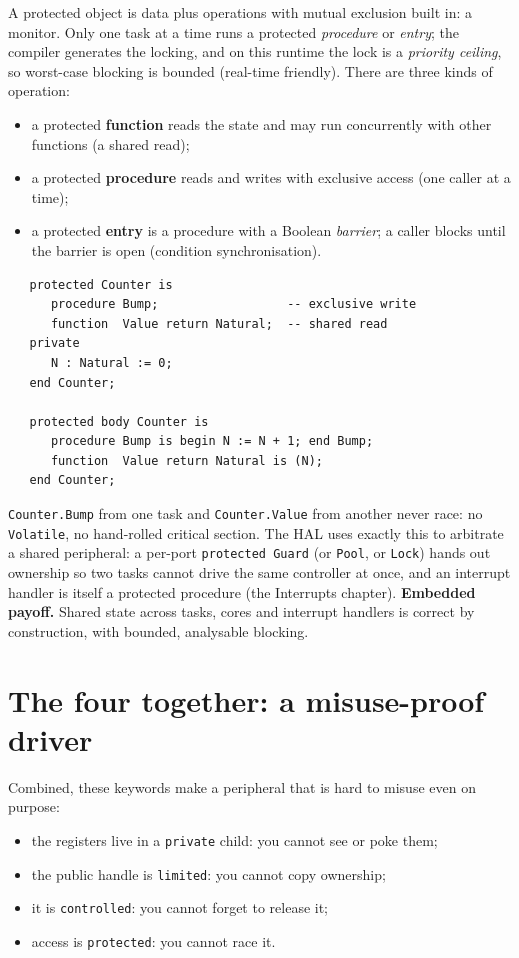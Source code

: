 A protected object is data plus operations with mutual exclusion built in: a
monitor. Only one task at a time runs a protected \emph{procedure} or
\emph{entry}; the compiler generates the locking, and on this runtime the lock is
a \emph{priority ceiling}, so worst-case blocking is bounded (real-time
friendly). There are three kinds of operation:

\begin{itemize}
  \item a protected \textbf{function} reads the state and may run concurrently
        with other functions (a shared read);
  \item a protected \textbf{procedure} reads and writes with exclusive access
        (one caller at a time);
  \item a protected \textbf{entry} is a procedure with a Boolean \emph{barrier};
        a caller blocks until the barrier is open (condition synchronisation).
\end{itemize}

\begin{lstlisting}
   protected Counter is
      procedure Bump;                  -- exclusive write
      function  Value return Natural;  -- shared read
   private
      N : Natural := 0;
   end Counter;

   protected body Counter is
      procedure Bump is begin N := N + 1; end Bump;
      function  Value return Natural is (N);
   end Counter;
\end{lstlisting}

\texttt{Counter.Bump} from one task and \texttt{Counter.Value} from another never
race: no \texttt{Volatile}, no hand-rolled critical section. The HAL uses
exactly this to arbitrate a shared peripheral: a per-port \texttt{protected Guard}
(or \texttt{Pool}, or \texttt{Lock}) hands out ownership so two tasks cannot drive
the same controller at once, and an interrupt handler is itself a protected
procedure (the Interrupts chapter). \textbf{Embedded payoff.} Shared state across
tasks, cores and interrupt handlers is correct by construction, with bounded,
analysable blocking.

\section{The four together: a misuse-proof driver}

Combined, these keywords make a peripheral that is hard to misuse even on purpose:

\begin{itemize}
  \item the registers live in a \texttt{private} child: you cannot see or poke
        them;
  \item the public handle is \texttt{limited}: you cannot copy ownership;
  \item it is \texttt{controlled}: you cannot forget to release it;
  \item access is \texttt{protected}: you cannot race it.
\end{itemize}

